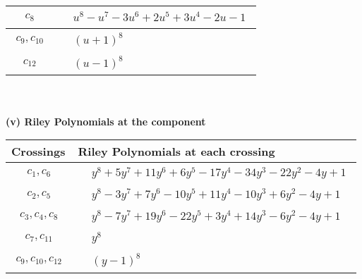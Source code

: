 \documentclass[1p]{elsarticle_modified}
\theoremstyle{definition}
\begin{document}
\begin{tabular}{m{50pt}|m{274pt}}
\hline $$\begin{aligned}c_{8}\end{aligned}$$&$\begin{aligned}
&u^8- u^7-3 u^6+2 u^5+3 u^4-2 u-1
\end{aligned}$\\
\hline $$\begin{aligned}c_{9},c_{10}\end{aligned}$$&$\begin{aligned}
&(u+1)^8
\end{aligned}$\\
\hline $$\begin{aligned}c_{12}\end{aligned}$$&$\begin{aligned}
&(u-1)^8
\end{aligned}$\\
\hline
\end{tabular}\\~\\
\newpage\renewcommand{\arraystretch}{1}
\flushleft \textbf{(v) Riley Polynomials at the component}\newline \\
\begin{tabular}{m{50pt}|m{274pt}}
Crossings & \hspace{64pt}Riley Polynomials at each crossing \\
\hline $$\begin{aligned}c_{1},c_{6}\end{aligned}$$&$\begin{aligned}
&y^8+5 y^7+11 y^6+6 y^5-17 y^4-34 y^3-22 y^2-4 y+1
\end{aligned}$\\
\hline $$\begin{aligned}c_{2},c_{5}\end{aligned}$$&$\begin{aligned}
&y^8-3 y^7+7 y^6-10 y^5+11 y^4-10 y^3+6 y^2-4 y+1
\end{aligned}$\\
\hline $$\begin{aligned}c_{3},c_{4},c_{8}\end{aligned}$$&$\begin{aligned}
&y^8-7 y^7+19 y^6-22 y^5+3 y^4+14 y^3-6 y^2-4 y+1
\end{aligned}$\\
\hline $$\begin{aligned}c_{7},c_{11}\end{aligned}$$&$\begin{aligned}
&y^8
\end{aligned}$\\
\hline $$\begin{aligned}c_{9},c_{10},c_{12}\end{aligned}$$&$\begin{aligned}
&(y-1)^8
\end{aligned}$\\
\hline
\end{tabular}\\~\\
\end{document}
